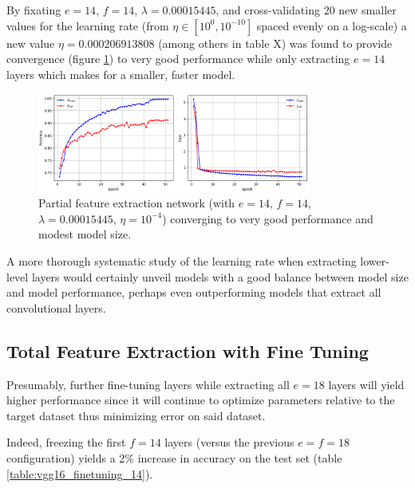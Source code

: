 By fixating $e = 14$, $f = 14$, $\lambda = 0.00015445$, and cross-validating 20 new smaller values for the learning rate (from $\eta \in [10^0, 10^{-10}]$ spaced evenly on a log-scale) a new value $\eta = 0.000206913808$ (among others in table X) was found to provide convergence (figure \ref{fig:vgg16_partial_convergence}) to very good performance while only extracting $e = 14$ layers which makes for a smaller, faster model.

\begin{figure}[ht]
    \centering
    \includegraphics[width=0.8\textwidth]{figs/vgg16_partial_convergence.png}
    \caption{Partial feature extraction network (with $e = 14$, $f = 14$, $\lambda = 0.00015445$, $\eta = 10^{-4}$) converging to very good performance and modest model size.}
    \label{fig:vgg16_partial_convergence}
\end{figure}

A more thorough systematic study of the learning rate when extracting lower-level layers would certainly unveil models with a good balance between model size and model performance, perhaps even outperforming models that extract all convolutional layers.

\subsection{Total Feature Extraction with Fine Tuning}

Presumably, further fine-tuning layers while extracting all $e = 18$ layers will yield higher performance since it will continue to optimize parameters relative to the target dataset thus minimizing error on said dataset.

Indeed, freezing the first $f = 14$ layers (versus the previous $e = f = 18$ configuration) yields a 2\% increase in accuracy on the test set (table \ref{table:vgg16_finetuning_14}).

